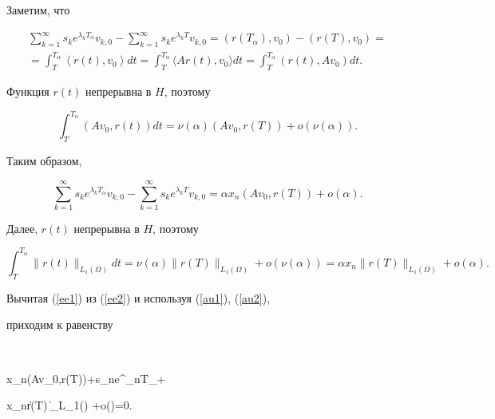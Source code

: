 Заметим, что


\begin{multline*}


\sum_{k=1}^\infty s_k e^{\lambda_k {T_\alpha}} v_{k,0}-


\sum_{k=1}^\infty  s_k e^{\lambda_k T} v_{k,0}=


(r(T_\alpha),v_0)-(r(T),v_0)= \\


%


=\int_T^{T_\alpha}\left\langle\Dot r(t),v_0\right\rangle dt=


\int_T^{T_\alpha}\langle Ar(t),v_0\rangle dt=


\int_T^{T_\alpha}(r(t),Av_0)dt.


\end{multline*}


Функция $r(t)$ непрерывна в $H$, поэтому


$$


\int_T^{T_\alpha}(Av_0,r(t))dt=\nu(\alpha)(Av_0,r(T))+o(\nu(\alpha)).


$$


Таким образом,


\begin{equation} \label{au1}


\sum_{k=1}^\infty  s_k e^{\lambda_k {T_\alpha}} v_{k,0}-


\sum_{k=1}^\infty  s_k  e^{\lambda_k T} v_{k,0}=


\alpha x_n(Av_0,r(T))+o(\alpha).


\end{equation}


Далее, $r(t)$ непрерывна в $H$, поэтому 


\begin{equation} \label{au2}


\int_T^{T_\alpha}\|r(t) \|_{L_1(\Omega)}  dt=


\nu(\alpha)\|r(T) \|_{L_1(\Omega)} +o(\nu(\alpha))=


\alpha x_n\|r(T) \|_{L_1(\Omega)} +o(\alpha).


\end{equation}


Вычитая (\ref{ee1}) из (\ref{ee2}) и используя (\ref{au1}), (\ref{au2}),


приходим к равенству


$$


\alpha x_n(Av_0,r(T))+\alpha s_ne^{\lambda_nT_\alpha}+


\alpha x_n\|r(T) \|_{L_1(\Omega)} +o(\alpha)=0.


